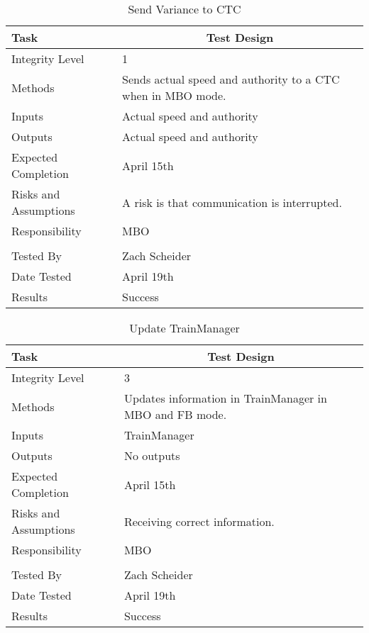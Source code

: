 \documentclass[]{article}
\begin{document}
\begin{table}[H]
	\centering
	\caption{Send Variance to CTC}
	\begin{tabular}{|l|l|}
		\hline
		Task & \multicolumn{1}{c|}{Test Design} \\ \hline
		Integrity Level & 1 \\ \hline
		Methods & \parbox[t]{10cm}{Sends actual speed and authority to a CTC when in MBO mode.}\\ \hline
		Inputs &  Actual speed and authority \\ \hline
		Outputs &  Actual speed and authority \\ \hline
		Expected Completion & \parbox[t]{10cm}{April 15th}\\ \hline
		Risks and Assumptions & \parbox[t]{10cm}{A risk is that communication is interrupted.} \\ \hline
		Responsibility & MBO\\ \hline
			\\ \hline
		Tested By   &  Zach Scheider\\	\hline
		Date Tested & \parbox[t]{10cm}{April 19th}\\ \hline
		Results & Success\\ \hline
	\end{tabular}
\end{table}

\begin{table}[H]
	\centering
	\caption{Update TrainManager}
	\begin{tabular}{|l|l|}
		\hline
		Task & \multicolumn{1}{c|}{Test Design} \\ \hline
		Integrity Level & 3 \\ \hline
		Methods & \parbox[t]{10cm}{Updates information in TrainManager in MBO and FB mode.}\\ \hline
		Inputs &  TrainManager \\ \hline
		Outputs &  No outputs \\ \hline
		Expected Completion & \parbox[t]{10cm}{April 15th}\\ \hline
		Risks and Assumptions & \parbox[t]{10cm}{Receiving correct information.} \\ \hline
		Responsibility & MBO\\ \hline
			\\ \hline
		Tested By   &  Zach Scheider\\	\hline
		Date Tested & \parbox[t]{10cm}{April 19th}\\ \hline
		Results & Success\\ \hline
	\end{tabular}
\end{table}
\end{document}
